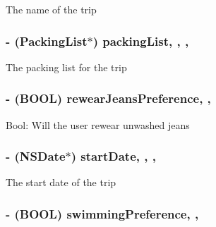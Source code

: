 The name of the trip \hypertarget{interface_trip_a985205885a33d59e7e8b899cab47f2d0}{
\subsubsection[{packing\-List}]{\setlength{\rightskip}{0pt plus 5cm}-\/ ({\bf Packing\-List}$\ast$) packing\-List\hspace{0.3cm}{\ttfamily [read]}, {\ttfamily [write]}, {\ttfamily [nonatomic]}, {\ttfamily [strong]}}}\label{interface_trip_a985205885a33d59e7e8b899cab47f2d0}
The packing list for the trip \hypertarget{interface_trip_a0a0bd7f81cb9866501819178b9167fad}{
\subsubsection[{rewear\-Jeans\-Preference}]{\setlength{\rightskip}{0pt plus 5cm}-\/ (B\-O\-O\-L) rewear\-Jeans\-Preference\hspace{0.3cm}{\ttfamily [read]}, {\ttfamily [write]}, {\ttfamily [atomic]}}}\label{interface_trip_a0a0bd7f81cb9866501819178b9167fad}
Bool\-: Will the user rewear unwashed jeans \hypertarget{interface_trip_aa73721dd452a5a0c94841aa155761d67}{
\subsubsection[{start\-Date}]{\setlength{\rightskip}{0pt plus 5cm}-\/ (N\-S\-Date$\ast$) start\-Date\hspace{0.3cm}{\ttfamily [read]}, {\ttfamily [write]}, {\ttfamily [nonatomic]}, {\ttfamily [strong]}}}\label{interface_trip_aa73721dd452a5a0c94841aa155761d67}
The start date of the trip \hypertarget{interface_trip_a3f7f9fac616d0861b0229a31aa485f39}{
\subsubsection[{swimming\-Preference}]{\setlength{\rightskip}{0pt plus 5cm}-\/ (B\-O\-O\-L) swimming\-Preference\hspace{0.3cm}{\ttfamily [read]}, {\ttfamily [write]}, {\ttfamily [atomic]}}}\label{interface_trip_a3f7f9fac616d0861b0229a31aa485f39}
